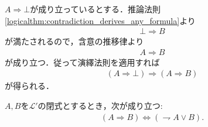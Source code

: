 	\begin{prf}
		$A \Longrightarrow \bot$が成り立っているとする．推論法則\ref{logicalthm:contradiction_derives_any_formula}より
		\begin{align}
			\bot \Longrightarrow B
		\end{align}
		が満たされるので，含意の推移律より
		\begin{align}
			A \Longrightarrow B
		\end{align}
		が成り立つ．従って演繹法則を適用すれば
		\begin{align}
			(A \Longrightarrow \bot) \Longrightarrow (A \Longrightarrow B)
		\end{align}
		が得られる．
		\QED
	\end{prf}
	
	\begin{screen}
		\begin{logicalthm}[含意は否定と論理和で表せる]\label{logicalthm:rule_of_inference_3}
			$A,B$を$\mathcal{L}'$の閉式とするとき，次が成り立つ:
			\begin{align}
				(A \Longrightarrow B) \Longleftrightarrow (\rightharpoondown A \vee B).
			\end{align}
		\end{logicalthm}
	\end{screen}
	
